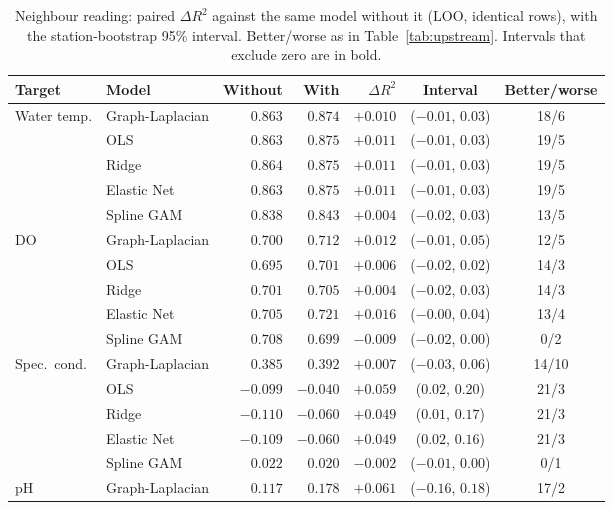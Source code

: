 \documentclass[11pt]{article}
\begin{document}
\begin{table}[h]
\centering
\small
\caption{Neighbour reading: paired $\Delta R^2$ against the same model without it (LOO, identical
rows), with the station-bootstrap 95\% interval. Better/worse as in Table~\ref{tab:upstream}.
Intervals that exclude zero are in bold.}
\label{tab:neighbour}
\begin{tabular}{ll rrrcc}
\toprule
Target & Model & Without & With & $\Delta R^2$ & Interval & Better/worse \\
\midrule
Water temp.   & Graph-Laplacian & $0.863$ & $0.874$ & $+0.010$ & ($-0.01$, $0.03$) & 18/6 \\
              & OLS             & $0.863$ & $0.875$ & $+0.011$ & ($-0.01$, $0.03$) & 19/5 \\
              & Ridge           & $0.864$ & $0.875$ & $+0.011$ & ($-0.01$, $0.03$) & 19/5 \\
              & Elastic Net     & $0.863$ & $0.875$ & $+0.011$ & ($-0.01$, $0.03$) & 19/5 \\
              & Spline GAM      & $0.838$ & $0.843$ & $+0.004$ & ($-0.02$, $0.03$) & 13/5 \\
\addlinespace
DO            & Graph-Laplacian & $0.700$ & $0.712$ & $+0.012$ & ($-0.01$, $0.05$) & 12/5 \\
              & OLS             & $0.695$ & $0.701$ & $+0.006$ & ($-0.02$, $0.02$) & 14/3 \\
              & Ridge           & $0.701$ & $0.705$ & $+0.004$ & ($-0.02$, $0.03$) & 14/3 \\
              & Elastic Net     & $0.705$ & $0.721$ & $+0.016$ & ($-0.00$, $0.04$) & 13/4 \\
              & Spline GAM      & $0.708$ & $0.699$ & $-0.009$ & ($-0.02$, $0.00$) & 0/2 \\
\addlinespace
Spec.\ cond.  & Graph-Laplacian & $0.385$ & $0.392$ & $+0.007$ & ($-0.03$, $0.06$) & 14/10 \\
              & OLS             & $-0.099$ & $-0.040$ & $\mathbf{+0.059}$ & ($0.02$, $0.20$) & 21/3 \\
              & Ridge           & $-0.110$ & $-0.060$ & $\mathbf{+0.049}$ & ($0.01$, $0.17$) & 21/3 \\
              & Elastic Net     & $-0.109$ & $-0.060$ & $\mathbf{+0.049}$ & ($0.02$, $0.16$) & 21/3 \\
              & Spline GAM      & $0.022$ & $0.020$ & $-0.002$ & ($-0.01$, $0.00$) & 0/1 \\
\addlinespace
pH            & Graph-Laplacian & $0.117$ & $0.178$ & $+0.061$ & ($-0.16$, $0.18$) & 17/2 \\

\end{tabular}
\end{table}
\end{document}
